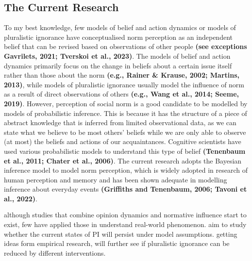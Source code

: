 \documentclass[
  11pt,
]{article}
\begin{document}
\hypertarget{the-current-research}{%
\subsection{The Current Research}\label{the-current-research}}

To my best knowledge, few models of belief and action dynamics or models
of pluralistic ignorance have conceptualised norm perception as an
independent belief that can be revised based on observations of other
people \textbf{(see exceptions Gavrilets, 2021; Tverskoi et al., 2023)}.
The models of belief and action dynamics primarily focus on the change
in beliefs about a certain issue itself rather than those about the norm
\textbf{(e.g., Rainer \& Krause, 2002; Martins, 2013)}, while models of
pluralistic ignorance usually model the influence of norm as a result of
direct observations of others \textbf{(e.g., Wang et al., 2014; Seeme,
2019)}. However, perception of social norm is a good candidate to be
modelled by models of probabilistic inference. This is because it has
the structure of a piece of abstract knowledge that is inferred from
limited observational data, as we can state what we believe to be most
others' beliefs while we are only able to observe (at most) the beliefs
and actions of our acquaintances. Cognitive scientists have used various
probabilistic models to understand this type of belief
\textbf{(Tenenbaum et al., 2011; Chater et al., 2006)}. The current
research adopts the Bayesian inference model to model norm perception,
which is widely adopted in research of human perception and memory and
has been shown adequate in modelling inference about everyday events
\textbf{(Griffiths and Tenenbaum, 2006; Tavoni et al., 2022)}.

although studies that combine opinion dynamics and normative influence
start to exist, few have applied those in understand real-world
phenomenon. aim to study whether the current states of PI will persist
under model assumptions. getting ideas form empirical research, will
further see if pluralistic ignorance can be reduced by different
interventions.
\end{document}
